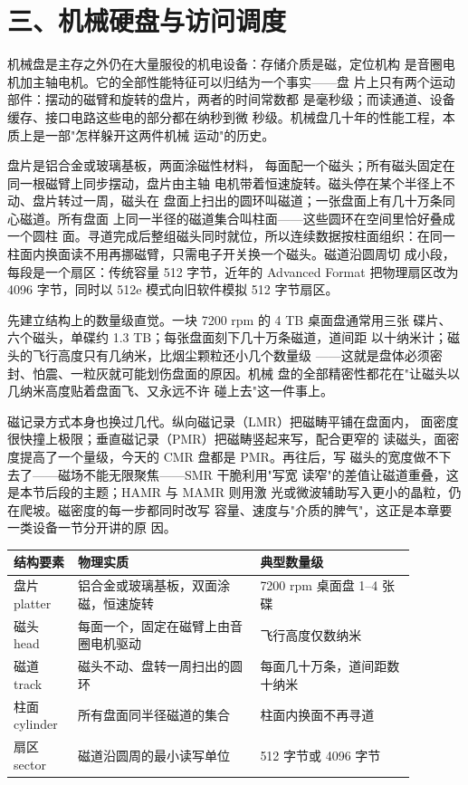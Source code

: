 \section{三、机械硬盘与访问调度}

机械盘是主存之外仍在大量服役的机电设备：存储介质是磁，定位机构
是音圈电机加主轴电机。它的全部性能特征可以归结为一个事实——盘
片上只有两个运动部件：摆动的磁臂和旋转的盘片，两者的时间常数都
是毫秒级；而读通道、设备缓存、接口电路这些电的部分都在纳秒到微
秒级。机械盘几十年的性能工程，本质上是一部"怎样躲开这两件机械
运动"的历史。

盘片是铝合金或玻璃基板，两面涂磁性材料，
每面配一个磁头；所有磁头固定在同一根磁臂上同步摆动，盘片由主轴
电机带着恒速旋转。磁头停在某个半径上不动、盘片转过一周，磁头在
盘面上扫出的圆环叫磁道；一张盘面上有几十万条同心磁道。所有盘面
上同一半径的磁道集合叫柱面——这些圆环在空间里恰好叠成一个圆柱
面。寻道完成后整组磁头同时就位，所以连续数据按柱面组织：在同一
柱面内换面读不用再挪磁臂，只需电子开关换一个磁头。磁道沿圆周切
成小段，每段是一个扇区：传统容量 512 字节，近年的 Advanced
Format 把物理扇区改为 4096 字节，同时以 512e 模式向旧软件模拟
512 字节扇区。

先建立结构上的数量级直觉。一块 7200 rpm 的 4 TB 桌面盘通常用三张
碟片、六个磁头，单碟约 1.3 TB；每张盘面刻下几十万条磁道，道间距
以十纳米计；磁头的飞行高度只有几纳米，比烟尘颗粒还小几个数量级
——这就是盘体必须密封、怕震、一粒灰就可能划伤盘面的原因。机械
盘的全部精密性都花在"让磁头以几纳米高度贴着盘面飞、又永远不许
碰上去"这一件事上。

磁记录方式本身也换过几代。纵向磁记录（LMR）把磁畴平铺在盘面内，
面密度很快撞上极限；垂直磁记录（PMR）把磁畴竖起来写，配合更窄的
读磁头，面密度提高了一个量级，今天的 CMR 盘都是 PMR。再往后，写
磁头的宽度做不下去了——磁场不能无限聚焦——SMR 干脆利用"写宽
读窄"的差值让磁道重叠，这是本节后段的主题；HAMR 与 MAMR 则用激
光或微波辅助写入更小的晶粒，仍在爬坡。磁密度的每一步都同时改写
容量、速度与"介质的脾气"，这正是本章要一类设备一节分开讲的原
因。

\begin{longtable}{L{0.14\linewidth}L{0.40\linewidth}L{0.34\linewidth}}
\toprule
结构要素 & 物理实质 & 典型数量级 \\
\midrule
盘片 platter & 铝合金或玻璃基板，双面涂磁，恒速旋转 & 7200 rpm 桌面盘 1--4 张碟 \\
磁头 head & 每面一个，固定在磁臂上由音圈电机驱动 & 飞行高度仅数纳米 \\
磁道 track & 磁头不动、盘转一周扫出的圆环 & 每面几十万条，道间距数十纳米 \\
柱面 cylinder & 所有盘面同半径磁道的集合 & 柱面内换面不再寻道 \\
扇区 sector & 磁道沿圆周的最小读写单位 & 512 字节或 4096 字节 \\
\bottomrule
\end{longtable}

